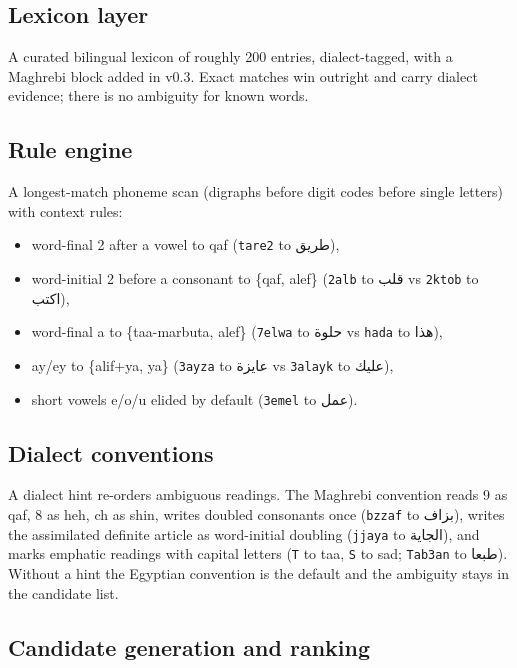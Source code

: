 \documentclass[11pt]{article}
\newcommand{\ar}[1]{{\arabicfont #1}}
\newcommand{\az}[1]{\texttt{#1}}
\begin{document}
\subsection{Lexicon layer}
\label{sec:lexicon}

A curated bilingual lexicon of roughly 200 entries, dialect-tagged, with a
Maghrebi block added in v0.3. Exact matches win outright and carry
dialect evidence; there is no ambiguity for known words.

\subsection{Rule engine}
\label{sec:rules}

A longest-match phoneme scan (digraphs before digit codes before single
letters) with context rules:

\begin{itemize}
  \item word-final 2 after a vowel to qaf (\az{tare2} to
        \ar{طريق}),
  \item word-initial 2 before a consonant to \{qaf, alef\}
        (\az{2alb} to \ar{قلب} vs \az{2ktob} to \ar{اكتب}),
  \item word-final a to \{taa-marbuta, alef\} (\az{7elwa} to
        \ar{حلوة} vs \az{hada} to \ar{هذا}),
  \item ay/ey to \{alif+ya, ya\} (\az{3ayza} to \ar{عايزة} vs
        \az{3alayk} to \ar{عليك}),
  \item short vowels e/o/u elided by default (\az{3emel} to
        \ar{عمل}).
\end{itemize}

\subsection{Dialect conventions}
\label{sec:dialect-conventions}

A dialect hint re-orders ambiguous readings. The Maghrebi convention
reads 9 as qaf, 8 as heh, ch as shin, writes doubled consonants once
(\az{bzzaf} to \ar{بزاف}), writes the assimilated definite article as
word-initial doubling (\az{jjaya} to \ar{الجاية}), and marks emphatic
readings with capital letters (\az{T} to taa, \az{S} to sad;
\az{Tab3an} to \ar{طبعا}). Without a hint the Egyptian convention is the
default and the ambiguity stays in the candidate list.

\subsection{Candidate generation and ranking}
\label{sec:candidates}
\end{document}

